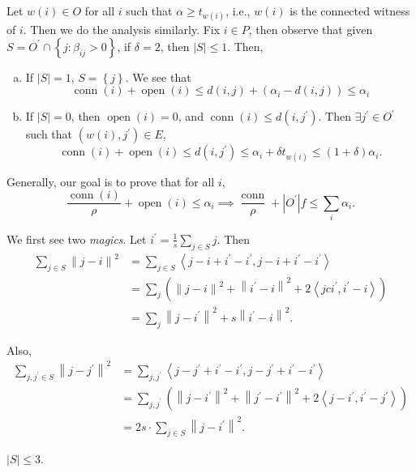 Let \(w(i)\in O\) for all \(i\) such that \(\alpha \geq t_{w(i)}\), i.e., \(w(i)\) is the connected witness of \(i\). Then we do the analysis similarly. Fix \(i\in P\), then observe that given \(S = O^\prime \cap \left\{ j\colon \beta _{ij} > 0 \right\}\), if \(\delta = 2\), then \(\left\vert S \right\vert \leq 1\). Then,
\begin{enumerate}[(a)]
	\item If \(\left\vert S \right\vert = 1\), \(S = \left\{ j \right\} \). We see that
	      \[
		      \mathop{\mathrm{conn}}(i) + \mathop{\mathrm{open}}(i) \leq d(i, j) + (\alpha _i - d(i, j)) \leq \alpha _i
	      \]
	\item If \(\left\vert S \right\vert = 0\), then \(\mathop{\mathrm{open}}(i) = 0\), and \(\mathop{\mathrm{conn}}(i) \leq d(i, j^\prime )\). Then \(\exists j^\prime \in O^\prime \) such that \((w(i), j^\prime )\in E\),
	      \[
		      \mathop{\mathrm{conn}}(i) + \mathop{\mathrm{open}}(i) \leq d(i, j^\prime )\leq \alpha _i + \delta t_{w(i)} \leq (1 + \delta )\alpha _i.
	      \]
\end{enumerate}

Generally, our goal is to prove that for all \(i\),
\[
	\frac{\mathop{\mathrm{conn}}(i)}{\rho} + \mathop{\mathrm{open}}(i) \leq \alpha _i \implies \frac{\mathop{\mathrm{conn}}}{\rho } + \left\vert O^\prime  \right\vert f \leq \sum_{i} \alpha _i.
\]

We first see two \emph{magics}. Let \(i^\prime = \frac{1}{s}\sum_{j\in S} j\). Then
\[
	\begin{split}
		\sum_{j\in S} \left\lVert j - i\right\rVert ^{2}
		&= \sum_{j\in S} \left\langle j - i + i^\prime - i^\prime , j - i + i^\prime - i^\prime  \right\rangle \\
		&= \sum_{j} \left( \left\lVert j - i\right\rVert ^{2} + \left\lVert i^\prime - i\right\rVert ^{2} + 2\left\langle j c i^\prime , i^\prime - i \right\rangle  \right) \\
		&= \sum_{j} \left\lVert j - i^\prime \right\rVert ^{2} + s \left\lVert i^\prime - i\right\rVert ^{2} .
	\end{split}
\]

Also,
\[
	\begin{split}
		\sum_{j, j^\prime \in S} \left\lVert j - j^\prime \right\rVert ^{2}
		&= \sum_{j, j^\prime }\left\langle j- j^\prime + i^\prime - i^\prime , j- j^\prime + i^\prime - i^\prime  \right\rangle  \\
		&= \sum_{j, j^\prime } \left( \left\lVert j - i^\prime \right\rVert^{2} + \left\lVert j^\prime - i^\prime \right\rVert ^{2} + 2 \left\langle j -i^\prime , i^\prime - j^\prime  \right\rangle   \right) \\
		&= 2s\cdot \sum_{j\in S} \left\lVert j - i^\prime \right\rVert ^{2} .
	\end{split}
\]

\begin{claim}
	\(\left\vert S \right\vert \leq 3\).
\end{claim}
\begin{explanation}

\end{explanation}